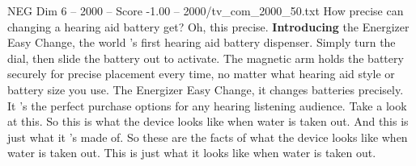 \begin{textsample}{NEG Dim 6 – 2000 – Score -1.00 – 2000/tv\_com\_2000\_50.txt}  \label{ex:f6_neg_012}
How precise can changing a hearing aid battery get?
Oh, this precise. \textbf{Introducing} the Energizer Easy Change, the world 's first hearing aid battery dispenser.
Simply turn the dial, then slide the battery out to activate.
The magnetic arm holds the battery securely for precise placement every time, no matter what hearing aid style or battery size you use.
The Energizer Easy Change, it changes batteries precisely.
It 's the perfect purchase options for any hearing listening audience.
Take a look at this.
So this is what the device looks like when water is taken out.
And this is just what it 's made of.
So these are the facts of what the device looks like when water is taken out.
This is just what it looks like when water is taken out.

\end{textsample}
